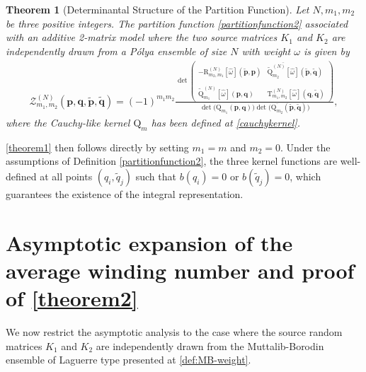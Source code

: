 \documentclass[pdflatex,sn-mathphys-num]{sn-jnl}
\theoremstyle{thmstyleone}
\newtheorem{theorem}{Theorem}[section]
\numberwithin{equation}{section}
\begin{document}
\begin{theorem}[Determinantal Structure of the Partition Function]\label{theorem3}
        Let $N,m_{1},m_{2}$ be three positive integers. The partition function \eqref{partitionfunction2} associated with an additive 2-matrix model where the two source matrices $K_{1}$ and $K_{2}$ are independently drawn from a Pólya ensemble of size $N$ with weight $\omega$ is given by
\begin{align}\label{maintheorem1}
            \mathscr{Z}^{\left(N\right)}_{m_{1},m_{2}}\left(\mathbf{p},\mathbf{q},\widetilde{\mathbf{p}},\widetilde{\mathbf{q}}\right)=(-1)^{m_1m_2}\frac{\det\left(\begin{array}{c|c}
            -\mathrm{R}^{\left ( N \right )}_{m_{2},m_{1}}\left [ \widehat{\omega} \right ]\left ( \widetilde{\mathbf{p}},\mathbf{p} \right ) & \overline{\widetilde{\mathrm{Q}}^{\left ( N \right )}_{m_{2}}\left [ \widehat{\omega} \right ]}\left ( \widetilde{\mathbf{p}},\widetilde{\mathbf{q}} \right ) \\ 
            \\\hline
            \overset{}{\widetilde{\mathrm{Q}}^{\left ( N \right )}_{m_{1}}\left [ \widehat{\omega} \right ]\left ( \mathbf{p},\mathbf{q} \right )} & \mathrm{T}^{\left ( N \right )}_{m_{1},m_{2}}\left [ \widehat{\omega} \right ]\left ( \mathbf{q},\widetilde{\mathbf{q}} \right )
            \end{array}\right)}{\det\Big ( \mathrm{Q}_{m_{1}}\left ( \mathbf{p},\mathbf{q} \right ) \Big )\det\Big ( \overline{\mathrm{Q}_{m_{2}}}\left ( \widetilde{\mathbf{p}},\widetilde{\mathbf{q}} \right ) \Big )},
\end{align}
where the Cauchy-like kernel $\mathrm{Q}_{m}$ has been defined at \eqref{cauchykernel}.
\end{theorem}

\autoref{theorem1} then follows directly by setting $m_{1}=m$ and $m_{2}=0$. Under the assumptions of Definition \eqref{partitionfunction2}, the three kernel functions are well-defined at all points $(q_{i},\widetilde{q}_{j})$ such that $b(q_{i})=0$ or $b(\widetilde q_{j})=0$, which guarantees the existence of the integral representation.


\section{Asymptotic expansion of the average winding number and proof of \autoref{theorem2}}\label{sec:asymp}

We now restrict the asymptotic analysis to the case where the source random matrices $K_{1}$ and $K_{2}$ are independently drawn from the Muttalib-Borodin ensemble of Laguerre type presented at \eqref{def:MB-weight}.
\end{document}
